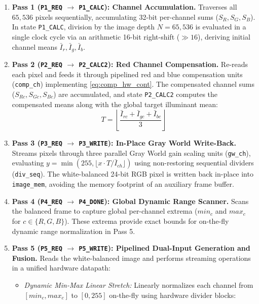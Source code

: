 \documentclass[10pt,twocolumn,letterpaper]{article}
\begin{document}
{\begin{enumerate}
    \item \textbf{Pass 1 (\texttt{P1\_REQ} $\rightarrow$ \texttt{P1\_CALC}): Channel Accumulation.} Traverses all $65,536$ pixels sequentially, accumulating 32-bit per-channel sums ($S_R, S_G, S_B$). In state \texttt{P1\_CALC}, division by the image depth $N = 65,536$ is evaluated in a single clock cycle via an arithmetic 16-bit right-shift ($\gg 16$), deriving initial channel means $\bar{I}_r, \bar{I}_g, \bar{I}_b$.
    \item \textbf{Pass 2 (\texttt{P2\_REQ} $\rightarrow$ \texttt{P2\_CALC2}): Red Channel Compensation.} Re-reads each pixel and feeds it through pipelined red and blue compensation units (\texttt{comp\_ch}) implementing \cref{eq:comp_hw_cont}. The compensated channel sums ($S_{Rc}, S_{Gc}, S_{Bc}$) are accumulated, and state \texttt{P2\_CALC2} computes the compensated means along with the global target illuminant mean:
    \begin{equation}
      T = \left\lfloor \frac{\bar{I}_{rc} + \bar{I}_{gc} + \bar{I}_{bc}}{3} \right\rfloor
      \label{eq:target_mean_hw}
    \end{equation}
    \item \textbf{Pass 3 (\texttt{P3\_REQ} $\rightarrow$ \texttt{P3\_WRITE}): In-Place Gray World Write-Back.} Streams pixels through three parallel Gray World gain scaling units (\texttt{gw\_ch}), evaluating $y = \min(255, \lfloor x \cdot T / \bar{I}_{ch}\rfloor)$ using non-restoring sequential dividers (\texttt{div\_seq}). The white-balanced 24-bit RGB pixel is written back in-place into \texttt{image\_mem}, avoiding the memory footprint of an auxiliary frame buffer.
    \item \textbf{Pass 4 (\texttt{P4\_REQ} $\rightarrow$ \texttt{P4\_DONE}): Global Dynamic Range Scanner.} Scans the balanced frame to capture global per-channel extrema ($min_c$ and $max_c$ for $c \in \{R,G,B\}$). These extrema provide exact bounds for on-the-fly dynamic range normalization in Pass 5.
    \item \textbf{Pass 5 (\texttt{P5\_REQ} $\rightarrow$ \texttt{P5\_WRITE}): Pipelined Dual-Input Generation and Fusion.} Reads the white-balanced image and performs streaming operations in a unified hardware datapath:
    \begin{itemize}
        \item \emph{Dynamic Min-Max Linear Stretch:} Linearly normalizes each channel from $[min_c, max_c]$ to $[0, 255]$ on-the-fly using hardware divider blocks:

\end{itemize}
\end{enumerate}}
\end{document}
